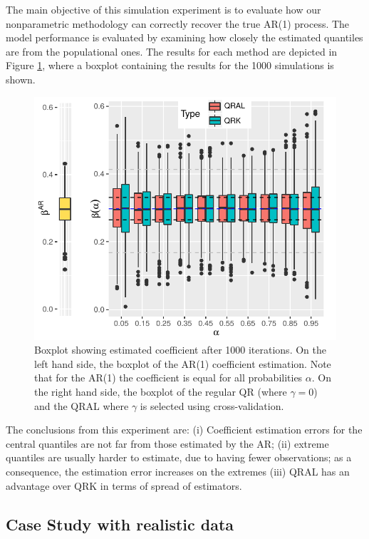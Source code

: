 The main objective of this simulation experiment is to evaluate how our nonparametric methodology can correctly recover the true AR(1) process. The model performance is evaluated by examining how closely the estimated quantiles are from the populational ones. The results for each method are depicted in Figure \ref{fig:boxplot-ar1}, where a boxplot containing the results for the 1000 simulations is shown. %
\begin{figure}[h]
	\centering
	\includegraphics[width=1.0\linewidth]{Images/boxplot-ar1.pdf}
	\caption{Boxplot showing estimated coefficient after 1000 iterations. On the left hand side, the boxplot of the AR(1) coefficient estimation. Note that for the AR(1) the coefficient is equal for all probabilities $\alpha$. On the right hand side, the boxplot of the regular QR (where $\gamma = 0$) and the QRAL where $\gamma$ is selected using cross-validation. }
	\label{fig:boxplot-ar1}
\end{figure}
The conclusions from this experiment are: (i) Coefficient estimation errors for the central quantiles are not far from those estimated by the AR; (ii) extreme quantiles are usually harder to estimate, due to having fewer observations; as a consequence, the estimation error increases on the extremes (iii) QRAL has an advantage over QRK in terms of spread of estimators.


\subsection{Case Study with realistic data}

